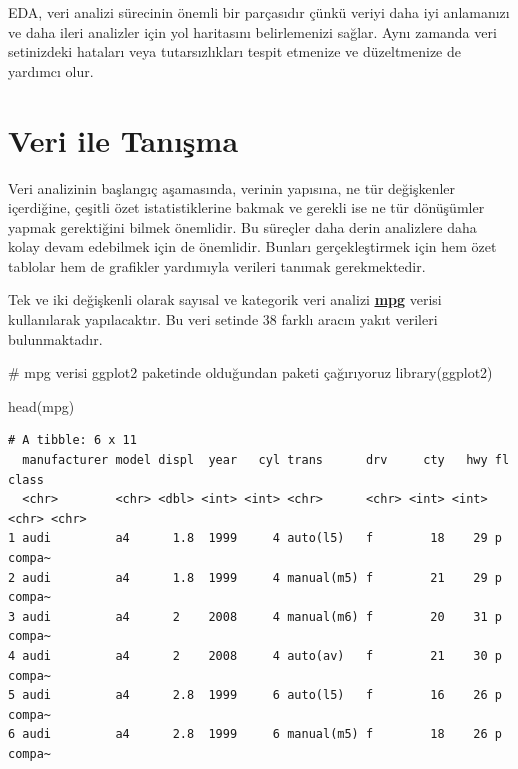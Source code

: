 \documentclass[
  letterpaper,
  DIV=11,
  numbers=noendperiod]{scrreprt}
\newenvironment{Shaded}{\begin{snugshade}}{\end{snugshade}}
\newcommand{\CommentTok}[1]{\textcolor[rgb]{0.37,0.37,0.37}{#1}}
\newcommand{\FunctionTok}[1]{\textcolor[rgb]{0.28,0.35,0.67}{#1}}
\newcommand{\NormalTok}[1]{\textcolor[rgb]{0.00,0.23,0.31}{#1}}
\begin{document}
EDA, veri analizi sürecinin önemli bir parçasıdır çünkü veriyi daha iyi
anlamanızı ve daha ileri analizler için yol haritasını belirlemenizi
sağlar. Aynı zamanda veri setinizdeki hataları veya tutarsızlıkları
tespit etmenize ve düzeltmenize de yardımcı olur.

\section*{Veri ile Tanışma}\label{veri-ile-tanux131ux15fma}


Veri analizinin başlangıç aşamasında, verinin yapısına, ne tür
değişkenler içerdiğine, çeşitli özet istatistiklerine bakmak ve gerekli
ise ne tür dönüşümler yapmak gerektiğini bilmek önemlidir. Bu süreçler
daha derin analizlere daha kolay devam edebilmek için de önemlidir.
Bunları gerçekleştirmek için hem özet tablolar hem de grafikler
yardımıyla verileri tanımak gerekmektedir.

Tek ve iki değişkenli olarak sayısal ve kategorik veri analizi
\href{https://ggplot2.tidyverse.org/reference/mpg.html}{\ul{\textbf{mpg}}}
verisi kullanılarak yapılacaktır. Bu veri setinde 38 farklı aracın yakıt
verileri bulunmaktadır.

\begin{Shaded}
\begin{Highlighting}[]
\CommentTok{\# mpg verisi ggplot2 paketinde olduğundan paketi çağırıyoruz}
\FunctionTok{library}\NormalTok{(ggplot2)}

\FunctionTok{head}\NormalTok{(mpg)}
\end{Highlighting}
\end{Shaded}

\begin{verbatim}
# A tibble: 6 x 11
  manufacturer model displ  year   cyl trans      drv     cty   hwy fl    class 
  <chr>        <chr> <dbl> <int> <int> <chr>      <chr> <int> <int> <chr> <chr> 
1 audi         a4      1.8  1999     4 auto(l5)   f        18    29 p     compa~
2 audi         a4      1.8  1999     4 manual(m5) f        21    29 p     compa~
3 audi         a4      2    2008     4 manual(m6) f        20    31 p     compa~
4 audi         a4      2    2008     4 auto(av)   f        21    30 p     compa~
5 audi         a4      2.8  1999     6 auto(l5)   f        16    26 p     compa~
6 audi         a4      2.8  1999     6 manual(m5) f        18    26 p     compa~
\end{verbatim}
\end{document}
